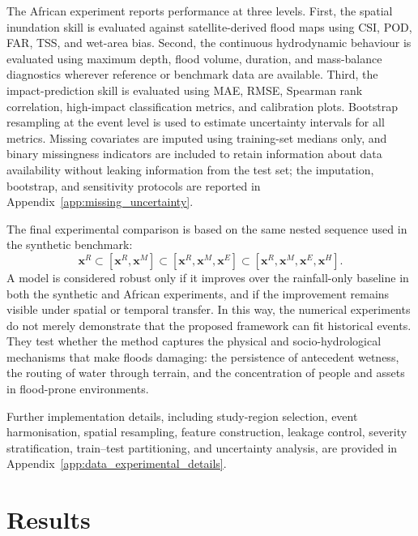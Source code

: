 \documentclass[pdflatex,sn-mathphys-ay]{sn-jnl}
\theoremstyle{thmstyleone}
\theoremstyle{thmstylethree}
\theoremstyle{thmstyletwo}
\begin{document}
The African experiment reports performance at three levels.  First, the
spatial inundation skill is evaluated against satellite-derived flood
maps using CSI, POD, FAR, TSS, and wet-area bias.  Second, the
continuous hydrodynamic behaviour is evaluated using maximum depth,
flood volume, duration, and mass-balance diagnostics wherever reference
or benchmark data are available.  Third, the impact-prediction skill is
evaluated using MAE, RMSE, Spearman rank correlation, high-impact
classification metrics, and calibration plots.  Bootstrap resampling at
the event level is used to estimate uncertainty intervals for all
metrics.  Missing covariates are imputed using training-set medians
only, and binary missingness indicators are included to retain
information about data availability without leaking information from
the test set; the imputation, bootstrap, and sensitivity protocols are
reported in Appendix~\ref{app:missing_uncertainty}.

The final experimental comparison is based on the same nested sequence
used in the synthetic benchmark:
\begin{equation}
  \mathbf{x}^{R}
  \subset
  [
    \mathbf{x}^{R},
    \mathbf{x}^{M}
  ]
  \subset
  [
    \mathbf{x}^{R},
    \mathbf{x}^{M},
    \mathbf{x}^{E}
  ]
  \subset
  [
    \mathbf{x}^{R},
    \mathbf{x}^{M},
    \mathbf{x}^{E},
    \mathbf{x}^{H}
  ].
  \label{eq:africa_nested_sequence}
\end{equation}
A model is considered robust only if it improves over the rainfall-only
baseline in both the synthetic and African experiments, and if the
improvement remains visible under spatial or temporal transfer.  In
this way, the numerical experiments do not merely demonstrate that the
proposed framework can fit historical events.  They test whether the
method captures the physical and socio-hydrological mechanisms that
make floods damaging: the persistence of antecedent wetness, the
routing of water through terrain, and the concentration of people and
assets in flood-prone environments.

Further implementation details, including study-region selection,
event harmonisation, spatial resampling, feature construction,
leakage control, severity stratification, train--test partitioning,
and uncertainty analysis, are provided in
Appendix~\ref{app:data_experimental_details}.

\section{Results}
\label{sec:results}
\end{document}
